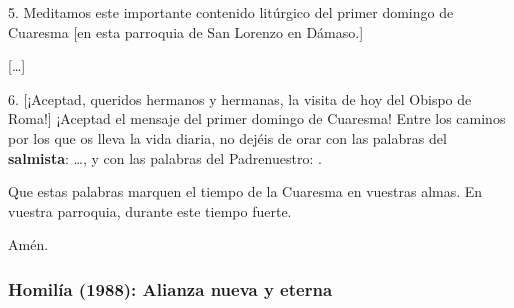 \begin{body}
5. Meditamos este importante contenido litúrgico del primer domingo de Cuaresma [en esta parroquia de San Lorenzo en Dámaso.]

[\ldots]

6. [¡Aceptad, queridos hermanos y hermanas, la visita de hoy del Obispo de Roma!] ¡Aceptad el mensaje del primer domingo de Cuaresma! Entre los caminos por los que os lleva la vida diaria, no dejéis de orar con las palabras del \textbf{salmista}:  \ldots, y con las palabras del Padrenuestro: .

Que estas palabras marquen el tiempo de la Cuaresma en vuestras almas. En vuestra parroquia, durante este tiempo fuerte.

Amén.
\end{body}


\subsubsection{Homilía (1988): Alianza nueva y eterna}


